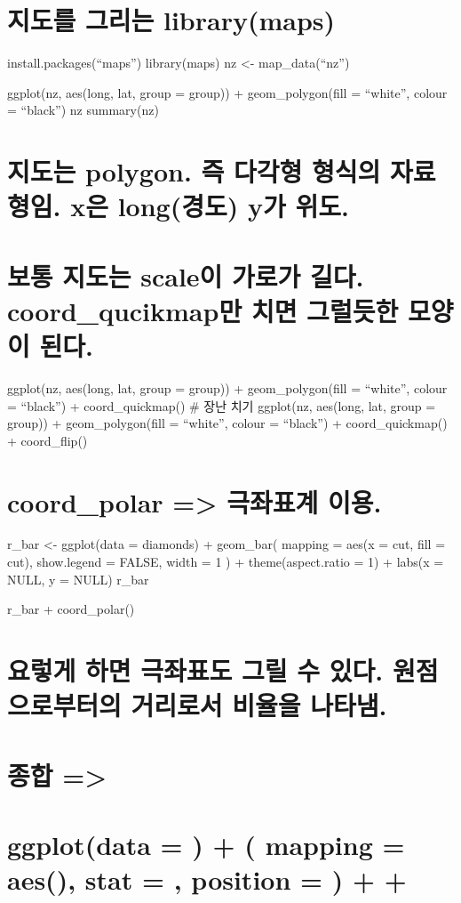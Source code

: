 \documentclass[]{article}
\begin{document}
\section{지도를 그리는 library(maps)}\label{--librarymaps}

install.packages(``maps'') library(maps) nz \textless{}-
map\_data(``nz'')

ggplot(nz, aes(long, lat, group = group)) + geom\_polygon(fill =
``white'', colour = ``black'') nz summary(nz)

\section{지도는 polygon. 즉 다각형 형식의 자료형임. x은 long(경도) y가
위도.}\label{-polygon.----.-x-long-y-.}

\section{보통 지도는 scale이 가로가 길다. coord\_qucikmap만 치면
그럴듯한 모양이 된다.}\label{--scale--.-coord_qucikmap----.}

ggplot(nz, aes(long, lat, group = group)) + geom\_polygon(fill =
``white'', colour = ``black'') + coord\_quickmap() \# 장난 치기
ggplot(nz, aes(long, lat, group = group)) + geom\_polygon(fill =
``white'', colour = ``black'') + coord\_quickmap() + coord\_flip()

\section{coord\_polar =\textgreater{} 극좌표계
이용.}\label{coord_polar--.}

r\_bar \textless{}- ggplot(data = diamonds) + geom\_bar( mapping = aes(x
= cut, fill = cut), show.legend = FALSE, width = 1 ) +
theme(aspect.ratio = 1) + labs(x = NULL, y = NULL) r\_bar

r\_bar + coord\_polar()

\section{요렇게 하면 극좌표도 그릴 수 있다. 원점으로부터의 거리로서
비율을 나타냄.}\label{-----.----.}

\section{종합 =\textgreater{}}

\section{\texorpdfstring{ggplot(data = ) + ( mapping = aes(), stat = ,
position = ) + +
}{ggplot(data = ) + ( mapping = aes(), stat = , position =  ) +  + }}\label{ggplotdata-mapping-aes-stat-position}
\end{document}
